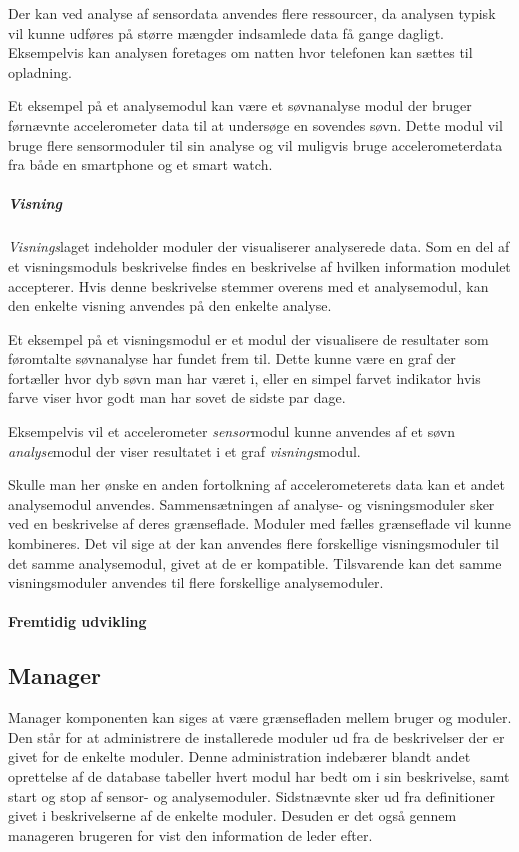 Der kan ved analyse af sensordata anvendes flere ressourcer, da analysen typisk vil kunne udføres på større mængder indsamlede data få gange dagligt.
Eksempelvis kan analysen foretages om natten hvor telefonen kan sættes til opladning.

Et eksempel på et analysemodul kan være et søvnanalyse modul der bruger førnævnte accelerometer data til at undersøge en sovendes søvn.
Dette modul vil bruge flere sensormoduler til sin analyse og vil muligvis bruge accelerometerdata fra både en smartphone og et smart watch.

\subparagraph{Visning}
\textit{Visnings}laget indeholder moduler der visualiserer analyserede data.
Som en del af et visningsmoduls beskrivelse findes en beskrivelse af hvilken information modulet accepterer.
Hvis denne beskrivelse stemmer overens med et analysemodul, kan den enkelte visning anvendes på den enkelte analyse.

Et eksempel på et visningsmodul er et modul der visualisere de resultater som føromtalte søvnanalyse har fundet frem til.
Dette kunne være en graf der fortæller hvor dyb søvn man har været i, eller en simpel farvet indikator hvis farve viser hvor godt man har sovet de sidste par dage.

Eksempelvis vil et accelerometer \textit{sensor}modul kunne anvendes af et søvn \textit{analyse}modul der viser resultatet i et graf \textit{visnings}modul.

Skulle man her ønske en anden fortolkning af accelerometerets data kan et andet analysemodul anvendes.
Sammensætningen af analyse- og visningsmoduler sker ved en beskrivelse af deres grænseflade.
Moduler med fælles grænseflade vil kunne kombineres.
Det vil sige at der kan anvendes flere forskellige visningsmoduler til det samme analysemodul, givet at de er kompatible.
Tilsvarende kan det samme visningsmoduler anvendes til flere forskellige analysemoduler.

\paragraph{Fremtidig udvikling}


\subsection*{Manager}\label{subsec:arkitektur-Manager}
Manager komponenten kan siges at være grænsefladen mellem bruger og moduler.
Den står for at administrere de installerede moduler ud fra de beskrivelser der er givet for de enkelte moduler.
Denne administration indebærer blandt andet oprettelse af de database tabeller hvert modul har bedt om i sin beskrivelse, samt start og stop af sensor- og analysemoduler.
Sidstnævnte sker ud fra definitioner givet i beskrivelserne af de enkelte moduler.
Desuden er det også gennem manageren brugeren for vist den information de leder efter.

